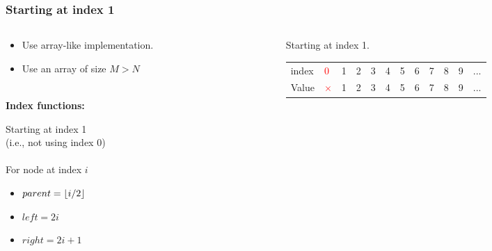 \documentclass[10pt]{beamer}
\DeclarePairedDelimiter\floor{\lfloor}{\rfloor}
\begin{document}
\begin{frame}[t]\frametitle{Starting at index 1}
	\begin{columns}[T] %
	\begin{column}{.5\linewidth} %
	{\footnotesize
		
		\begin{itemize}
			\item
			Use array-like implementation.

			\item
			Use an array of size \(M > N\)
		\end{itemize}

		\phantom{line}\\
		
		\textbf{Index functions:}
		
		Starting at index 1\\ 
		(i.e., not using index 0)\\
		\phantom{line} \\
		For node at index \(i\)

		\begin{itemize}
			\item
			 \( parent = \floor*{i / 2} \)
			
			\item
			\( left = 2 i \)
			
			\item
			\( right = 2 i + 1 \)
		\end{itemize}
	} %
	\end{column} %
	\begin{column}{.5\linewidth} %
		\begin{example}
		{\footnotesize
		Starting at index 1.
		} %

		{\scriptsize
			
		} %

		{\tiny 
			\begin{table}[t]
			\setlength{\tabcolsep}{5pt}
			\begin{tabular}
				{|
					p{.3cm} 
					!{\vrule width 1pt}
					*{11}{p{.05cm}|} 
				}
				\hline
				\textcolor{colorIndex}{index}	
				&\textcolor{red}{0}
				&\textcolor{colorIndex}{1}	&\textcolor{colorIndex}{2}	
				&\textcolor{colorIndex}{3}	&\textcolor{colorIndex}{4}	
				&\textcolor{colorIndex}{5}	&\textcolor{colorIndex}{6}	
				&\textcolor{colorIndex}{7}	&\textcolor{colorIndex}{8}	
				&\textcolor{colorIndex}{9}	&\textcolor{colorIndex}{...}\\
				
				
				Value	
				&\textcolor{red}{$\times$}	
				&1	&2	&3	&4	&5	&6	&7	&8	&9	&...\\
				\hline
			\end{tabular}
			\end{table}
		} %
		\end{example}
		\end{column} %
	\end{columns} %
\end{frame}
\end{document}
